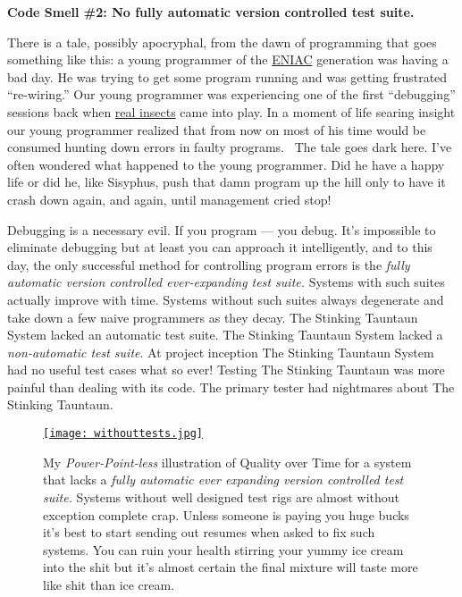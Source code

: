 \medskip
\noindent\textbf{Code Smell \#2: No fully automatic version controlled test
suite.}
\medskip

There is a tale, possibly apocryphal, from the dawn of programming that
goes something like this: a young programmer of the
\href{http://en.wikipedia.org/wiki/ENIAC}{ENIAC} generation was having a
bad day. He was trying to get some program running and was getting
frustrated ``re-wiring.'' Our young programmer was experiencing one of
the first ``debugging'' sessions back when
\href{http://en.wikipedia.org/wiki/Grace_Hopper}{real insects} came into
play. In a moment of life searing insight our young programmer realized
that from now on most of his time would be consumed hunting down errors
in faulty programs.~ The tale goes dark here. I've often wondered what
happened to the young programmer. Did he have a happy life or did he,
like Sisyphus, push that damn program up the hill only to have it crash
down again, and again, until management cried stop!

Debugging is a necessary evil. If you program --- you debug. It's
impossible to eliminate debugging but at least you can approach it
intelligently, and to this day, the only successful method for
controlling program errors is the \emph{fully automatic version
controlled ever-expanding test suite.} Systems with such suites actually
improve with time. Systems without such suites always degenerate and
take down a few naive programmers as they decay. The Stinking Tauntaun
System lacked an automatic test suite. The Stinking Tauntaun System
lacked a \emph{non-automatic test suite}. At project inception The Stinking Tauntaun System had no
useful test cases what so ever! Testing The Stinking Tauntaun was more
painful than dealing with its code. The primary tester had nightmares
about The Stinking Tauntaun.


\begin{figure}[htbp]
\centering
\href{https://bakerjd99.wordpress.com/2015/04/12/cutting-the-stinking-tauntaun-and-other-adventures-in-software-archeology/withouttests/}{\texttt{[image: withouttests.jpg]}}
\caption{My \emph{Power-Point-less} illustration of Quality over Time for a system that
lacks a \emph{fully automatic ever expanding version controlled test suite.}
Systems without well designed test rigs are almost without exception
complete crap. Unless someone is paying you huge bucks it's best to
start sending out resumes when asked to fix such systems. You can ruin
your health stirring your yummy ice cream into the shit but it's almost
certain the final mixture will taste more like shit than
ice cream.}
\label{fig:4971X1}
\end{figure}



